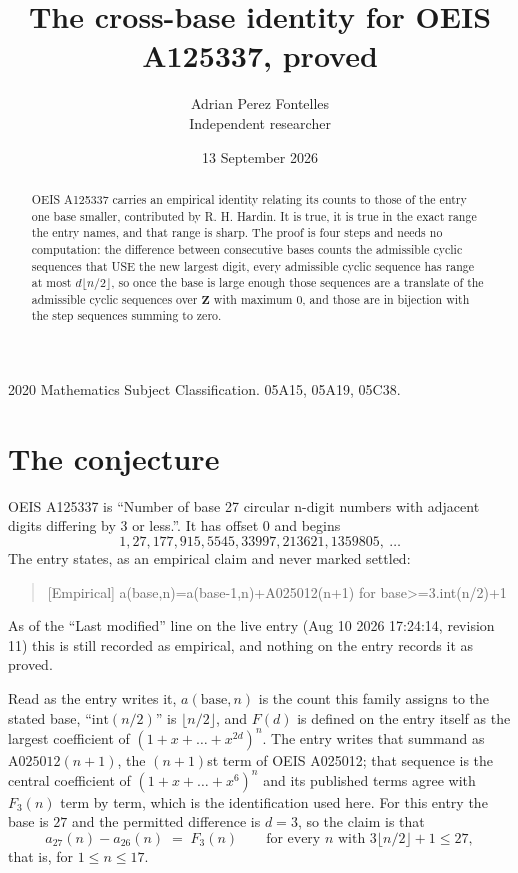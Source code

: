 \documentclass[11pt,a4paper]{article}
\title{The cross-base identity for OEIS A125337, proved}
\author{Adrian Perez Fontelles\\ \small Independent researcher}
\date{13 September 2026}
\theoremstyle{plain}
\theoremstyle{definition}
\begin{document}
\maketitle

\begin{abstract}
OEIS A125337 carries an empirical identity relating its counts to those of the entry one base
smaller, contributed by R. H. Hardin. It is true, it is true in the exact range the entry
names, and that range is sharp. The proof is four steps and needs no computation: the
difference between consecutive bases counts the admissible cyclic sequences that USE the new
largest digit, every admissible cyclic sequence has range at most $d\lfloor n/2\rfloor$, so
once the base is large enough those sequences are a translate of the admissible cyclic
sequences over $\mathbf{Z}$ with maximum $0$, and those are in bijection with the step
sequences summing to zero.
\end{abstract}

\noindent\small 2020 Mathematics Subject Classification. 05A15, 05A19, 05C38.\normalsize

\section{The conjecture}

OEIS A125337 is ``Number of base 27 circular n-digit numbers with adjacent digits differing by 3 or less.''. It has offset $0$ and begins
\[
1, 27, 177, 915, 5545, 33997, 213621, 1359805,\ \dots
\]
The entry states, as an empirical claim and never marked settled:
\begin{quote}
[Empirical] a(base,n)=a(base-1,n)+A025012(n+1) for base>=3.int(n/2)+1
\end{quote}
As of the ``Last modified'' line on the live entry (Aug 10 2026 17:24:14, revision 11)
this is still recorded as empirical, and nothing on the entry records it as proved.

Read as the entry writes it, $a(\mathrm{base},n)$ is the count this family assigns to the
stated base, ``$\mathrm{int}(n/2)$'' is $\lfloor n/2\rfloor$, and $F(d)$ is defined on the
entry itself as the largest coefficient of $(1+x+\dots+x^{2d})^{n}$. The entry writes that summand as $\mathrm{A025012}(n+1)$, the $(n+1)$st term of OEIS A025012; that sequence is the central coefficient of $(1+x+\dots+x^{6})^{n}$ and its published terms agree with $F_{3}(n)$ term by term, which is the identification used here. For this entry
the base is $27$ and the permitted difference is $d=3$, so the claim is that
\[
a_{27}(n)-a_{26}(n)\;=\;F_{3}(n)
\qquad\text{for every } n \text{ with } 3\lfloor n/2\rfloor+1\le27,
\]
that is, for $1\le n\le17$.
\end{document}
